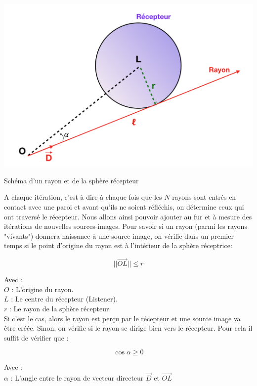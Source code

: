 \begin{figureth}
	\includegraphics[width=0.8\linewidth]{images/touche}
	\caption{Schéma d'un rayon et de la sphère récepteur}
	\label{touche}
\end{figureth}

A chaque itération, c'est à dire à chaque fois que les $N$ rayons sont entrés en contact avec une paroi et avant qu'ils ne soient réfléchis, on détermine ceux qui ont traversé le récepteur. Nous allons ainsi pouvoir ajouter au fur et à mesure des itérations de nouvelles sources-images. Pour savoir si un rayon (parmi les rayons "vivants") donnera naissance à une source image, on vérifie dans un premier temps si le point d'origine du rayon est à l'intérieur de la sphère réceptrice:

\begin{equation}
||\overrightarrow{OL}|| \leqslant r
\end{equation}

Avec : \\
$O$ : L'origine du rayon. \\
$L$ : Le centre du récepteur (Listener). \\
$r$ : Le rayon de la sphère récepteur. \\

Si c'est le cas, alors le rayon est perçu par le récepteur et une source image va être créée. Sinon, on vérifie si le rayon se dirige bien vers le récepteur. Pour cela il suffit de vérifier que :

\begin{equation}
\cos{\alpha} \geqslant 0
\end{equation}

Avec : \\
$\alpha$ : L'angle entre le rayon de vecteur directeur $\overrightarrow{D}$ et $\overrightarrow{OL}$  \\


